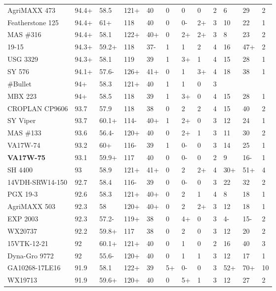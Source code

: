 \documentclass[12pt, letterpaper]{article}
\begin{document}
\begin{landscape}
\begin{ThreePartTable}
\begin{longtable}{llllllllllll}
  AgriMAXX 473 & 94.4+ & 58.5 & 121+ & 40 & 0 & 0 & 0 & 2 & 6 & 29 & 2 \\ 
  Featherstone 125 & 94.4+ & 61+ & 118 & 40 & 0 & 0- & 2+ & 3 & 10 & 22 & 1 \\ 
  MAS \#316 & 94.4+ & 58.1 & 122+ & 40+ & 0 & 2+ & 2+ & 3 & 8 & 23 & 2 \\ 
  19-15 & 94.3+ & 59.2+ & 118 & 37- & 1 & 1 & 2 & 4 & 16 & 47+ & 2 \\ 
  USG 3329 & 94.3+ & 58.1 & 119 & 39 & 1 & 3+ & 1 & 4 & 15 & 28 & 1 \\ 
  SY 576 & 94.1+ & 57.6- & 126+ & 41+ & 0 & 1 & 3+ & 4 & 18 & 38 & 1 \\ 
  \#Bullet & 94+ & 58.3 & 121+ & 40 & 1 & 1 & 0 & 3 &  &  &  \\ 
  MBX 223 & 94+ & 58.5 & 118 & 39 & 1 & 3+ & 0 & 4 & 15 & 28 & 1 \\ 
  CROPLAN CP9606 & 93.7 & 57.9 & 118 & 38 & 0 & 2 & 2 & 4 & 15 & 40 & 2 \\ 
  SY Viper & 93.7 & 60.1+ & 114- & 40+ & 1 & 2+ & 0 & 3 & 12 & 24 & 1 \\ 
  MAS \#133 & 93.6 & 56.4- & 120+ & 40 & 0 & 2+ & 1 & 3 & 11 & 30 & 2 \\ 
  VA17W-74 & 93.2 & 60+ & 116- & 39 & 1 & 0- & 0 & 3 & 14 & 25 & 1 \\ 
  \textbf{VA17W-75} & 93.1 & 59.9+ & 117 & 40 & 0 & 0- & 0 & 2 & 9 & 16- & 1 \\ 
  SH 4400 & 93 & 58.9 & 121+ & 41+ & 0 & 2 & 2+ & 4 & 30+ & 51+ & 4 \\ 
  14VDH-SRW14-150 & 92.7 & 58.4 & 116- & 39 & 0 & 0- & 0 & 3 & 22 & 32 & 2 \\ 
  PGX 19-3 & 92.6 & 58.3 & 121+ & 40+ & 0 & 2 & 1 & 4 & 8 & 18 & 1 \\ 
  AgriMAXX 503 & 92.3 & 58 & 120+ & 40+ & 0 & 2 & 2+ & 3 & 12 & 18 & 1 \\ 
  EXP 2003 & 92.3 & 57.2- & 119+ & 38 & 0 & 4+ & 0 & 3 & 4- & 15- & 2 \\ 
  WX20737 & 92.2 & 59.8+ & 117 & 38 & 0 & 2 & 0 & 3 & 12 & 20 & 2 \\ 
  15VTK-12-21 & 92 & 60.1+ & 121+ & 40 & 0 & 1 & 0 & 2 & 16 & 40 & 3 \\ 
  Dyna-Gro 9772 & 92 & 55.6- & 120+ & 40 & 0 & 1 & 1 & 3 & 12 & 17 & 1 \\ 
  GA10268-17LE16 & 91.9 & 58.1 & 122+ & 39 & 5+ & 0- & 0 & 3 & 52+ & 70+ & 10 \\ 
  WX19713 & 91.9 & 59.6+ & 120+ & 40 & 0 & 5+ & 1 & 3 & 12 & 27 & 2 \\ 

\end{longtable}
\end{ThreePartTable}
\end{landscape}
\end{document}
